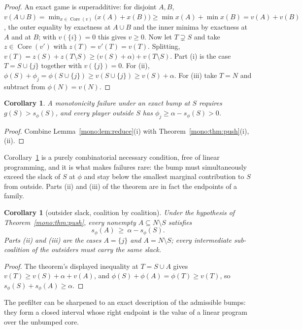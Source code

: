 \documentclass[11pt]{article}
\newtheorem{corollary}[theorem]{Corollary}
\newcommand{\core}{\operatorname{Core}}
\begin{document}
\begin{proof}
An exact game is superadditive: for disjoint $A,B$,
$v(A\cup B)=\min_{x\in\core(v)}\bigl(x(A)+x(B)\bigr)\ge\min x(A)+\min x(B)
=v(A)+v(B)$, the outer equality by exactness at $A\cup B$ and the inner
minima by exactness at $A$ and at $B$; with $v(\{i\})=0$ this gives $v\ge0$.
Now let $T\supsetneq S$ and take $z\in\core(v')$ with $z(T)=v'(T)=v(T)$.
Splitting, $v(T)=z(S)+z(T\setminus S)\ge\bigl(v(S)+\alpha\bigr)
+v(T\setminus S)$.  Part (i) is the case $T=S\cup\{j\}$ together with
$v(\{j\})=0$.  For (ii), $\phi(S)+\phi_j=\phi(S\cup\{j\})\ge v(S\cup\{j\})
\ge v(S)+\alpha$.  For (iii) take $T=N$ and subtract from
$\phi(N)=v(N)$.
\end{proof}

\begin{corollary}\label{mono:cor:prefilter}
A monotonicity failure under an exact bump at $S$ requires
$g(S)>s_\phi(S)$, and every player outside $S$ has
$\phi_j\ge\alpha-s_\phi(S)>0$.
\end{corollary}

\begin{proof}
Combine Lemma~\ref{mono:lem:reduce}(i) with
Theorem~\ref{mono:thm:push}(i),(ii).
\end{proof}

Corollary~\ref{mono:cor:prefilter} is a purely combinatorial necessary
condition, free of linear programming, and it is what makes failures rare:
the bump must simultaneously exceed the slack of $S$ at $\phi$ and stay below
the smallest marginal contribution to $S$ from outside.  Parts (ii) and
(iii) of the theorem are in fact the endpoints of a family.

\begin{corollary}[outsider slack, coalition by coalition]\label{mono:cor:lout}
Under the hypothesis of Theorem~\ref{mono:thm:push}, every nonempty
$A\subseteq N\setminus S$ satisfies
\[
 s_\phi(A)\ \ge\ \alpha-s_\phi(S).
\]
Parts (ii) and (iii) are the cases $A=\{j\}$ and $A=N\setminus S$; every
intermediate sub-coalition of the outsiders must carry the same slack.
\end{corollary}

\begin{proof}
The theorem's displayed inequality at $T=S\cup A$ gives
$v(T)\ge v(S)+\alpha+v(A)$, and $\phi(S)+\phi(A)=\phi(T)\ge v(T)$, so
$s_\phi(S)+s_\phi(A)\ge\alpha$.
\end{proof}

The prefilter can be sharpened to an exact description of the admissible
bumps: they form a closed interval whose right endpoint is the value of a
linear program over the unbumped core.
\end{document}
